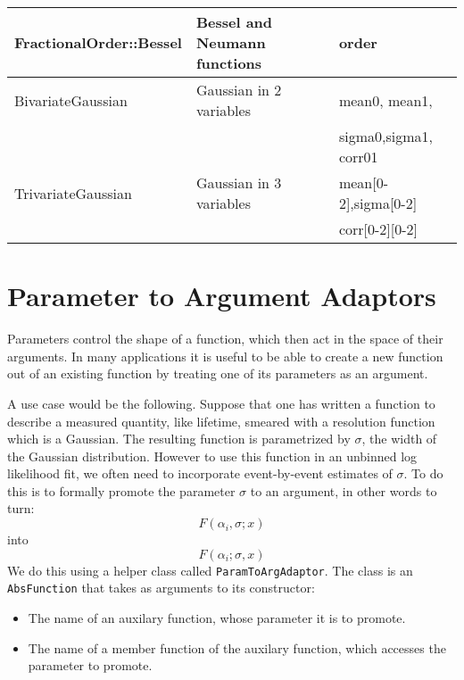\documentclass{report}
\begin{document}
\begin{table*}
\begin{center}
\begin{tabular}{|l|l|l|}
FractionalOrder::Bessel        & Bessel and Neumann functions      & order                   \\ \hline
BivariateGaussian              & Gaussian in 2 variables           & mean0, mean1,           \\ 
                               &                                   & sigma0,sigma1, corr01   \\ \hline
TrivariateGaussian             & Gaussian in 3 variables           & mean[0-2],sigma[0-2]    \\
                               &                                   & corr[0-2][0-2]          \\ \hline
\end{tabular}
\end{center}
\end{table*}
\section {Parameter to Argument Adaptors}

Parameters control the shape of a function, which then act in the space of their
arguments.  In many applications it is useful to be able to create a new function
out of an existing function by treating one of its parameters as an argument.

A use case would be the following.  Suppose that one has written a function to
describe a measured quantity, like lifetime, smeared with a resolution function
which is a Gaussian.  The resulting function is parametrized by $\sigma$, the
width of the Gaussian distribution.  However to use this function in an unbinned
log likelihood fit, we often need to incorporate event-by-event estimates of 
$\sigma$.  To do this is to formally promote the parameter $\sigma$ to an argument,
in other words to turn:
\begin {equation}
	F(\alpha_i, \sigma; x)
\end {equation}
into
\begin{equation}
	F(\alpha_i; \sigma, x)
\end{equation}
We do this using a helper class called \verb+ParamToArgAdaptor+.  The class is an
\verb+AbsFunction+ that takes as arguments to its constructor:  
\begin{itemize}
\item{The name of an auxilary function, whose parameter it is to promote.}
\item{The name of a member function of the auxilary function, which accesses the 
parameter to promote.}
\end{itemize}
\end{document}
